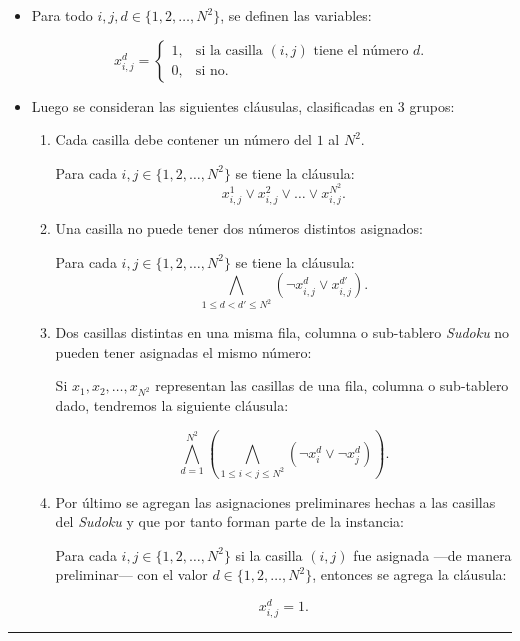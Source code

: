 \documentclass[12pt,lettersize,oneside]{article}
\begin{document}
\begin{itemize}
\item Para todo $i,j,d \in \{ 1,2,\ldots,N^2\}$, se definen las variables:

\[ x_{i,j}^d = \begin{cases} 1, & \mbox{si la casilla $(i,j)$ tiene el número
    $d$.} \\
    0, & \mbox{si no.} \end{cases}\]

\item Luego se consideran las siguientes cláusulas, clasificadas en 3 grupos:
\vspace{-2.5mm}

\begin{enumerate}
\item Cada casilla debe contener un número del $1$ al $N^2$.

     Para cada $i,j \in \{1,2,\ldots,N^2\}$ se tiene la cláusula:
       \[ x_{i,j}^1 \vee x_{i,j}^2 \vee \ldots \vee x_{i,j}^{N^2}.\]

\item Una casilla no puede tener dos números distintos asignados:

     Para cada $i,j \in \{1,2,\ldots,N^2\}$ se tiene la cláusula:
     \[ \bigwedge_{1\leq d < d' \leq N^2} (\neg x_{i,j}^d \vee x_{i,j}^{d'}).\]

\item Dos casillas distintas en una misma fila, columna o sub-tablero
  \emph{Sudoku} no pueden tener asignadas el mismo número:

     Si $x_1,x_2,\ldots, x_{N^2}$ representan las casillas de una fila, columna
     o sub-tablero dado, tendremos la siguiente cláusula:

     \[ \bigwedge_{d=1}^{N^2} \left( \bigwedge_{1\leq i < j \leq N^2}
       \left( \neg x_{i}^d \vee \neg x_{j}^{d} \right)\right).\]

\item Por último se agregan las asignaciones preliminares hechas a las casillas
  del \emph{Sudoku} y que por tanto forman parte de la instancia:

      Para cada $i,j \in \{1,2,\ldots, N^2\}$ si la casilla $(i,j)$ fue asignada
      ---de manera preliminar--- con el valor $d \in \{1,2,\ldots,N^2\}$, entonces
      se agrega la cláusula:

      \[ x_{i,j}^d= 1.\]
\end{enumerate}
\end{itemize}\vspace{-2.5mm}
\rule{4cm}{0.3mm}
\end{document}
